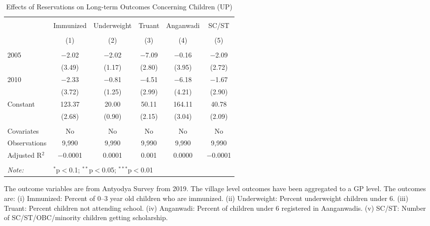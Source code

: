 \begin{table}[!htbp]
\centering
\begin{threeparttable}

  \caption{Effects of Reservations on Long-term Outcomes Concerning Children (UP)} 
  \label{up_shrug_children_05_10} 
\scriptsize 
\begin{tabular}{@{\extracolsep{0pt}}lccccc} 
\\[-1.8ex]\hline 
\hline \\[-1.8ex] 
 & Immunized & Underweight & Truant & Anganwadi & SC/ST \\ 
\\[-1.8ex] & (1) & (2) & (3) & (4) & (5)\\ 
\hline \\[-1.8ex] 
 2005 & $-$2.02 & $-$2.02 & $-$7.09 & $-$0.16 & $-$2.09 \\ 
  & (3.49) & (1.17) & (2.80) & (3.95) & (2.72) \\ 
  2010 & $-$2.33 & $-$0.81 & $-$4.51 & $-$6.18 & $-$1.67 \\ 
  & (3.72) & (1.25) & (2.99) & (4.21) & (2.90) \\ 
  Constant & 123.37 & 20.00 & 50.11 & 164.11 & 40.78 \\ 
  & (2.68) & (0.90) & (2.15) & (3.04) & (2.09) \\ 
 \hline \\[-1.8ex] 
Covariates & No & No & No & No & No \\ 
Observations & 9,990 & 9,990 & 9,990 & 9,990 & 9,990 \\ 
Adjusted R$^{2}$ & $-$0.0001 & 0.0001 & 0.001 & 0.0000 & $-$0.0001 \\ 
\hline 
\hline \\[-1.8ex] 
\textit{Note:}  & \multicolumn{5}{l}{$^{*}$p$<$0.1; $^{**}$p$<$0.05; $^{***}$p$<$0.01} \\ 
\end{tabular} 
\begin{tablenotes}[flushleft]
\scriptsize
\item The outcome variables are from Antyodya Survey from 2019.
                   The village level outcomes have been aggregated to a GP level. The outcomes are:
                   (i) Immunized: Percent of 0--3 year old children who are immunized. 
                   (ii) Underweight: Percent underweight children under 6.
                   (iii) Truant: Percent children not attending school.
                   (iv) Anganwadi: Percent of children under 6 registered in Aanganwadis.
                   (v) SC/ST: Number of SC/ST/OBC/minority children getting scholarship.
\end{tablenotes}
\end{threeparttable}
\end{table}
